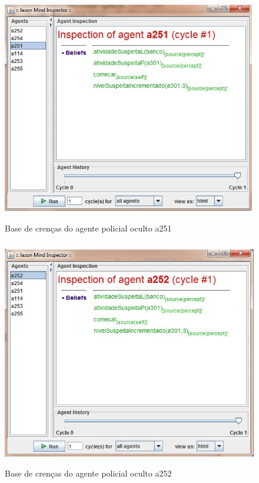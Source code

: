 \begin{figure}
\centering
\includegraphics [height=10cm]{figuras/crencas_policial251.jpg}
\caption{Base de crenças do agente policial oculto a251}
\label{baseA251}
\end{figure}
\begin{figure}
\centering
\includegraphics [height=10cm]{figuras/crencas_policial252.jpg}
\caption{Base de crenças do agente policial oculto a252}
\label{baseA252}
\end{figure}
